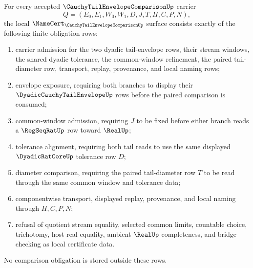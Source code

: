 \begin{theorem}
\label{thm:cauchy-tail-envelope-comparison-namecert-obligations}
For every accepted $\CauchyTailEnvelopeComparisonUp$ carrier
$$
Q=(E_0,E_1,W_0,W_1,D,J,T,H,C,P,N),
$$
the local $\NameCert_{\CauchyTailEnvelopeComparisonUp}$ surface consists exactly of the following finite obligation rows:
\begin{enumerate}
\item carrier admission for the two dyadic tail-envelope rows, their stream windows, the shared dyadic tolerance, the common-window refinement, the paired tail-diameter row, transport, replay, provenance, and local naming rows;
\item envelope exposure, requiring both branches to display their $\DyadicCauchyTailEnvelopeUp$ rows before the paired comparison is consumed;
\item common-window admission, requiring $J$ to be fixed before either branch reads a $\RegSeqRatUp$ row toward $\RealUp$;
\item tolerance alignment, requiring both tail reads to use the same displayed $\DyadicRatCoreUp$ tolerance row $D$;
\item diameter comparison, requiring the paired tail-diameter row $T$ to be read through the same common window and tolerance data;
\item componentwise transport, displayed replay, provenance, and local naming through $H,C,P,N$;
\item refusal of quotient stream equality, selected common limits, countable choice, trichotomy, host real equality, ambient $\RealUp$ completeness, and bridge checking as local certificate data.
\end{enumerate}
No comparison obligation is stored outside these rows.
\end{theorem}
